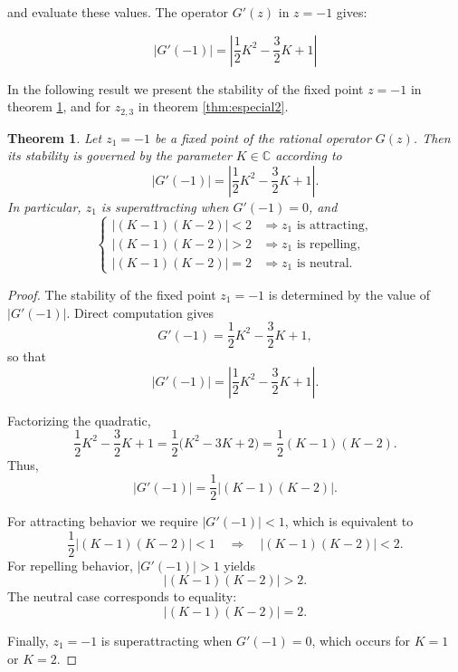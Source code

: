 \documentclass{article}
\newtheorem{theorem}{Theorem}[section]
\theoremstyle{definition}
\theoremstyle{remark}
\begin{document}
and evaluate these values. The operator $G'(z)$ in $z = -1$ gives:

\begin{equation}
	|G'(-1)| = \left| \frac{1}{2} K^{2}-\frac{3}{2} K +1 \right|
\end{equation}


\vspace{1em}
In the following result we present the stability of the fixed point $z = -1$ in theorem \ref{thm:especial1}, and for $z_{2,3}$ in theorem \ref{thm:especial2}.



\begin{theorem}\label{thm:especial1}
	Let \( z_{1} = -1 \) be a fixed point of the rational operator \( G(z) \).
	Then its stability is governed by the parameter \( K \in \mathbb{C} \) according to
	\[
	|G'(-1)| = \left| \frac{1}{2} K^{2} - \frac{3}{2} K + 1 \right|.
	\]
	In particular, $z_1$ is superattracting when $G'(-1) = 0$, and
	\[
	\begin{cases}
		\left| \left(K -1\right) \left(K -2\right) \right|  < 2  & \Rightarrow z_{1} \text{ is attracting}, \\[6pt]
		\left| \left(K -1\right) \left(K -2\right) \right|  > 2  & \Rightarrow z_{1} \text{ is repelling}, \\[6pt]
		\left| \left(K -1\right) \left(K -2\right) \right|  = 2  & \Rightarrow z_{1} \text{ is neutral}.
	\end{cases}
	\]
\end{theorem}

\begin{proof}
	The stability of the fixed point \( z_1 = -1 \) is determined by the value of \( |G'(-1)| \).
	Direct computation gives
	\[
	G'(-1) = \frac{1}{2}K^2 - \frac{3}{2}K + 1,
	\]
	so that
	\[
	|G'(-1)| = \left| \frac{1}{2}K^2 - \frac{3}{2}K + 1 \right|.
	\]

	Factorizing the quadratic,
	\[
	\frac{1}{2}K^2 - \frac{3}{2}K + 1 = \frac{1}{2}\big( K^2 - 3K + 2 \big) = \frac{1}{2}(K-1)(K-2).
	\]
	Thus,
	\[
	|G'(-1)| = \frac{1}{2}\left| (K-1)(K-2) \right|.
	\]

	For attracting behavior we require \( |G'(-1)| < 1 \), which is equivalent to
	\[
	\frac{1}{2}\left| (K-1)(K-2) \right| < 1 \quad \Longrightarrow \quad \left| (K-1)(K-2) \right| < 2.
	\]
	For repelling behavior, \( |G'(-1)| > 1 \) yields
	\[
	\left| (K-1)(K-2) \right| > 2.
	\]
	The neutral case corresponds to equality:
	\[
	\left| (K-1)(K-2) \right| = 2.
	\]

	Finally, \( z_1 = -1 \) is superattracting when \( G'(-1) = 0 \), which occurs for \( K = 1 \) or \( K = 2 \).
\end{proof}
\end{document}
